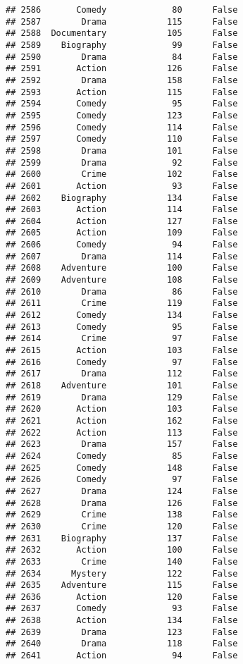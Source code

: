 \documentclass[
]{article}
\begin{document}
\begin{verbatim}
## 2586       Comedy             80      False
## 2587        Drama            115      False
## 2588  Documentary            105      False
## 2589    Biography             99      False
## 2590        Drama             84      False
## 2591       Action            126      False
## 2592        Drama            158      False
## 2593       Action            115      False
## 2594       Comedy             95      False
## 2595       Comedy            123      False
## 2596       Comedy            114      False
## 2597       Comedy            110      False
## 2598        Drama            101      False
## 2599        Drama             92      False
## 2600        Crime            102      False
## 2601       Action             93      False
## 2602    Biography            134      False
## 2603       Action            114      False
## 2604       Action            127      False
## 2605       Action            109      False
## 2606       Comedy             94      False
## 2607        Drama            114      False
## 2608    Adventure            100      False
## 2609    Adventure            108      False
## 2610        Drama             86      False
## 2611        Crime            119      False
## 2612       Comedy            134      False
## 2613       Comedy             95      False
## 2614        Crime             97      False
## 2615       Action            103      False
## 2616       Comedy             97      False
## 2617        Drama            112      False
## 2618    Adventure            101      False
## 2619        Drama            129      False
## 2620       Action            103      False
## 2621       Action            162      False
## 2622       Action            113      False
## 2623        Drama            157      False
## 2624       Comedy             85      False
## 2625       Comedy            148      False
## 2626       Comedy             97      False
## 2627        Drama            124      False
## 2628        Drama            126      False
## 2629        Crime            138      False
## 2630        Crime            120      False
## 2631    Biography            137      False
## 2632       Action            100      False
## 2633        Crime            140      False
## 2634      Mystery            122      False
## 2635    Adventure            115      False
## 2636       Action            120      False
## 2637       Comedy             93      False
## 2638       Action            134      False
## 2639        Drama            123      False
## 2640        Drama            118      False
## 2641       Action             94      False

\end{verbatim}
\end{document}
